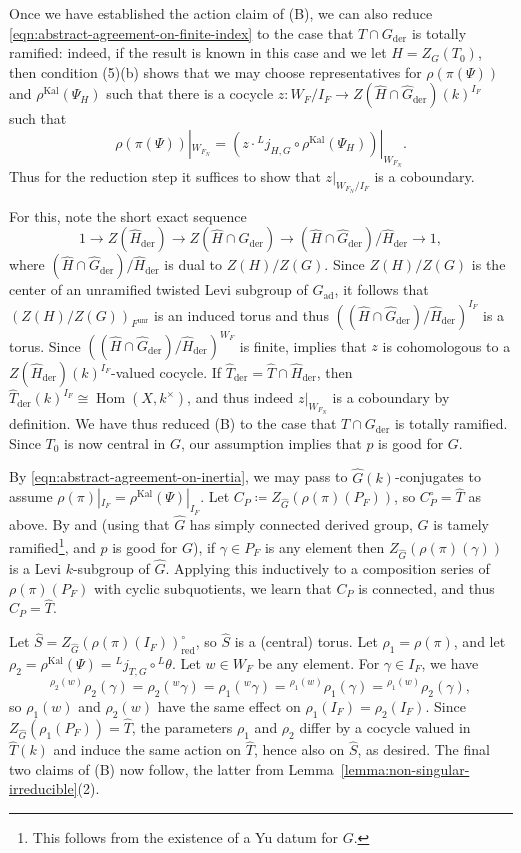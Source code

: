 \documentclass[reqno]{amsart}
\numberwithin{equation}{subsection}
\newcommand{\wh}[1]{\widehat{#1}}
\newcommand{\co}{\colon}
\newcommand{\ld}{{}^L}
\DeclareMathOperator{\Hom}{Hom}
\DeclareMathOperator{\ad}{ad}
\DeclareMathOperator{\unr}{unr}
\DeclareMathOperator{\red}{red}
\DeclareMathOperator{\Kal}{Kal}
\DeclareMathOperator{\der}{der}
\theoremstyle{remark}
\numberwithin{equation}{subsection}
\numberwithin{figure}{subsection}
\begin{document}
Once we have established the action claim of (B), we can also reduce \eqref{eqn:abstract-agreement-on-finite-index} to the case that $T \cap G_{\der}$ is totally ramified: indeed, if the result is known in this case and we let $H = Z_G(T_0)$, then condition (5)(b) shows that we may choose representatives for $\rho(\pi(\Psi))$ and $\rho^{\Kal}(\Psi_H)$ such that there is a cocycle $z\co W_F/I_F \to Z(\wh H \cap \wh G_{\der})(k)^{I_F}$ such that
\[
\rho(\pi(\Psi))|_{W_{F_N}} = \left(z \cdot \ld j_{H,G} \circ \rho^{\Kal}(\Psi_H)\right)|_{W_{F_N}}.
\]
Thus for the reduction step it suffices to show that $z|_{W_{F_N}/I_F}$ is a coboundary.

For this, note the short exact sequence
\[
1 \to Z(\wh H_{\der}) \to Z(\wh H \cap \wh G_{\der}) \to (\wh H \cap \wh G_{\der})/\wh H_{\der} \to 1,
\]
where $(\wh H \cap \wh G_{\der})/\wh H_{\der}$ is dual to $Z(H)/Z(G)$. Since $Z(H)/Z(G)$ is the center of an unramified twisted Levi subgroup of $G_{\ad}$, it follows that $(Z(H)/Z(G))_{F^{\unr}}$ is an induced torus and thus $((\wh H \cap \wh G_{\der})/\wh H_{\der})^{I_F}$ is a torus. Since $((\wh H \cap \wh G_{\der})/\wh H_{\der})^{W_F}$ is finite, \cite[Lemma~5.3.4]{Cot26b} implies that $z$ is cohomologous to a $Z(\wh H_{\der})(k)^{I_F}$-valued cocycle. If $\wh T_{\der} = \wh T \cap \wh H_{\der}$, then $\wh T_{\der}(k)^{I_F} \cong \Hom(X, k^\times)$, and thus indeed $z|_{W_{F_N}}$ is a coboundary by definition. We have thus reduced (B) to the case that $T \cap G_{\der}$ is totally ramified. Since $T_0$ is now central in $G$, our assumption implies that $p$ is good for $G$.

By \eqref{eqn:abstract-agreement-on-inertia}, we may pass to $\wh G(k)$-conjugates to assume $\rho(\pi)|_{I_F} = \rho^{\Kal}(\Psi)|_{I_F}$. Let
$C_P\coloneqq Z_{\wh G}(\rho(\pi)(P_F))$, so $C_P^\circ = \wh T$ as above. By \cite[Proposition 2.1]{GH91} and \cite[Theorem 2.15]{St75} (using that $\wh G$ has simply connected derived group, $G$ is tamely ramified\footnote{This follows from the existence of a Yu datum for $G$.}, and $p$ is good for $G$), if $\gamma \in P_F$ is any element then $Z_{\wh G}(\rho(\pi)(\gamma))$ is a Levi $k$-subgroup of $\wh G$. Applying this inductively to a composition series of $\rho(\pi)(P_F)$ with cyclic subquotients, we learn that $C_P$ is connected, and thus $C_P = \wh T$. 

Let $\wh S = Z_{\wh G}(\rho(\pi)(I_F))^\circ_{\red}$, so $\wh S$ is a (central) torus. Let $\rho_1 = \rho(\pi)$, and let $\rho_2 = \rho^{\Kal}(\Psi) = \ld j_{T,G} \circ \ld\theta$. Let $w \in W_F$ be any element. For $\gamma \in I_F$, we have
\begin{equation}\label{eq:common-inertial-conjugation}
^{\rho_2(w)}\rho_2(\gamma) = \rho_2({}^w\gamma) = \rho_1({}^w\gamma) = {}^{\rho_1(w)}\rho_1(\gamma) = {}^{\rho_1(w)}\rho_2(\gamma),
\end{equation}
so $\rho_1(w)$ and $\rho_2(w)$ have the same effect on $\rho_1(I_F) = \rho_2(I_F)$. Since $Z_{\wh G}(\rho_1(P_F)) =\wh T$, the parameters $\rho_1$ and $\rho_2$ differ by a cocycle valued in $\wh T(k)$ and induce the same action on $\wh T$, hence also on $\wh S$, as desired. The final two claims of (B) now follow, the latter from Lemma~\ref{lemma:non-singular-irreducible}(2).
\end{document}
